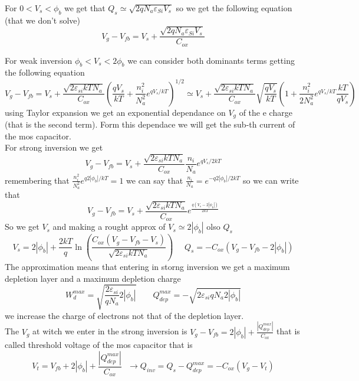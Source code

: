 \vspace{5mm}
For $0<V_s<\phi_b$ we get that $Q_s\simeq \sqrt{2qN_a\varepsilon_{Si}V_s}$ so we get the following equation (that we don't solve)
\begin{equation}
V_g-V_{fb}=V_s+\frac{\sqrt{2qN_a\varepsilon_{Si}V_s}}{C_{ox}}
\end{equation}

\vspace{5mm}
For weak inversion $\phi_b<V_s<2\phi_b$ we can consider both dominants terms 
getting the following equation 
\begin{equation}
V_g-V_{fb}=V_s+\frac{\sqrt{2\varepsilon_{si}kTN_a}}{C_{ox}}\left(\frac{qV_s}{kT}+\frac{n_i^2}{N_a^2}e^{qV_s/kT} \right)^{1/2}\simeq V_s+\frac{\sqrt{2\varepsilon_{si}kTN_a}}{C_{ox}}\sqrt{\frac{qV_s}{kT}}\left(1+\frac{n_i^2}{2N_a^2}e^{qV_s/kT}\frac{kT}{qV_s}\right)
\end{equation}
using Taylor expansion we get an exponential dependance on $V_g$ of the e charge (that is the second term). Form this dependace we will get the sub-th current of the mos capacitor.\\

\vspace{5mm}
For strong inversion we get 
\begin{equation}
V_g-V_{fb}=V_s+\frac{\sqrt{2\varepsilon_{si}kTN_a}}{C_{ox}}\frac{n_i}{N_a}e^{qV_s/2kT}
\end{equation}
remembering that $\frac{n_i^2}{N_a^2}e^{q2|\phi_b|/kT}=1$ we can say that $\frac{n_i}{N_a}=e^{-q2|\phi_b|/2kT}$ so we can write that 
\begin{equation}
V_g-V_{fb}=V_s+\frac{\sqrt{2\varepsilon_{si}kTN_a}}{C_{ox}}e^{\frac{q(V_s-2|\phi_b|)}{2kT}}
\end{equation}
So we get $V_s$ and making a rought approx of $V_s\simeq 2|\phi_b|$ olso $Q_s$
\begin{equation}
V_s=2|\phi_b|+\frac{2kT}{q}\ln \left(\frac{C_{ox}(V_g-V_{fb}-V_s)}{\sqrt{2\varepsilon_{si}kTN_a}} \right) \ \ \ \ \ \ Q_s=-C_{ox}(V_g-V_{fb}-2|\phi_b|)
\end{equation}
The approximation means that entering in storng inversion we get a maximum depletion layer and a maximum depletion charge
\begin{equation}
W_d^{max}=\sqrt{\frac{2\varepsilon_{si}}{qN_a}2|\phi_b|} \ \ \ \ \ \ \ \ \ Q_{dep}^{max}=-\sqrt{2\varepsilon_{si}qN_a2|\phi_b|}
\end{equation}
we increase the charge of electrons not that of the depletion layer.\\
The $V_g$ at witch we enter in the strong inversion is $V_g-V_{fb}=2|\phi_b|+\frac{|Q_{dep}^{max}|}{C_{ox}}$ that is called threshold voltage of the mos capacitor that is 
\begin{equation}
V_t=V_{fb}+2|\phi_b|+\frac{|Q_{dep}^{max}|}{C_{ox}} \ \ \ \rightarrow Q_{inv}=Q_s-Q_{dep}^{max}=-C_{ox}(V_g-V_t)
\end{equation}

